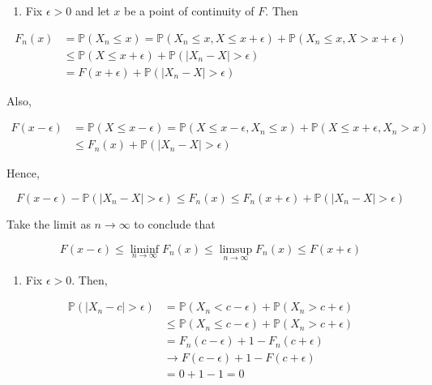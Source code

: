 \begin{enumerate}[tightlist,label={\arabic*.}]
\item
  Fix \(\epsilon > 0\) and let \(x\) be a point of continuity of \(F\).
  Then
\end{enumerate}

\begin{align}
F_n(x) & = \mathbb{P}(X_n \leq x) = \mathbb{P}(X_n \leq x, X \leq x + \epsilon) + \mathbb{P}(X_n \leq x, X > x + \epsilon) \\
       & \leq \mathbb{P}(X \leq x + \epsilon) + \mathbb{P}(|X_n - X| > \epsilon) \\
       & = F(x + \epsilon) + \mathbb{P}(|X_n - X| > \epsilon)
\end{align}

Also,

\begin{align}
F(x - \epsilon) & = \mathbb{P}(X \leq x - \epsilon) = \mathbb{P}(X \leq x - \epsilon, X_n \leq x) + \mathbb{P}(X \leq x + \epsilon, X_n > x) \\
                & \leq F_n(x) + \mathbb{P}(|X_n - X| > \epsilon)
\end{align}

Hence,

\[ F(x - \epsilon) - \mathbb{P}(|X_n - X| > \epsilon) \leq F_n(x) \leq F_n(x + \epsilon) + \mathbb{P}(|X_n - X| > \epsilon) \]

Take the limit as \(n \rightarrow \infty\) to conclude that

\[ F(x - \epsilon) \leq \liminf_{n \rightarrow \infty} F_n(x) \leq \limsup_{n \rightarrow \infty} F_n(x) \leq F(x + \epsilon) \]

\begin{enumerate}[tightlist,label={\arabic*.},resume]
\item
  Fix \(\epsilon > 0\). Then,
\end{enumerate}

\begin{align}
\mathbb{P}(|X_n - c| > \epsilon) & = \mathbb{P}(X_n < c - \epsilon) + \mathbb{P}(X_n > c + \epsilon) \\
                                 & \leq \mathbb{P}(X_n \leq c - \epsilon) + \mathbb{P}(X_n > c + \epsilon) \\
                                 & = F_n(c - \epsilon) + 1 - F_n(c + \epsilon) \\
                                 & \rightarrow F(c - \epsilon) + 1 - F(c + \epsilon) \\
                                 & = 0 + 1 - 1 = 0
\end{align}

